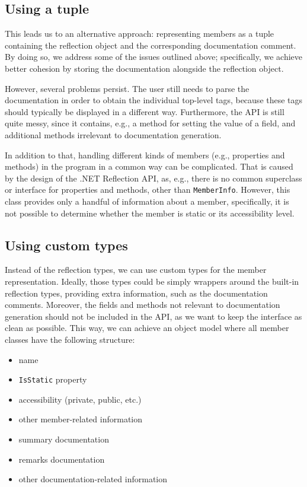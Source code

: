 \subsection*{Using a tuple}

This leads us to an alternative approach: representing members as a tuple containing the reflection object and the corresponding documentation comment.
By doing so, we address some of the issues outlined above; specifically, we achieve better cohesion by storing the documentation alongside the reflection object.

However, several problems persist.
The user still needs to parse the documentation in order to obtain the individual top-level tags, because these tags should typically be displayed in a different way.
Furthermore, the API is still quite messy, since it contains, e.g., a method for setting the value of a field, and additional methods irrelevant to documentation generation.

In addition to that, handling different kinds of members (e.g., properties and methods) in the program in a common way can be complicated.
That is caused by the design of the .NET Reflection API, as, e.g., there is no common superclass or interface for properties and methods, other than \texttt{MemberInfo}.
However, this class provides only a handful of information about a member, specifically, it is not possible to determine whether the member is static or its accessibility level.

\subsection*{Using custom types}

Instead of the reflection types, we can use custom types for the member representation.
Ideally, those types could be simply wrappers around the built-in reflection types, providing extra information, such as the documentation comments.
Moreover, the fields and methods not relevant to documentation generation should not be included in the API, as we want to keep the interface as clean as possible.
This way, we can achieve an object model where all member classes have the following structure:

\begin{itemize}
    \item name
    \item \texttt{IsStatic} property
    \item accessibility (private, public, etc.)
    \item other member-related information
    \item summary documentation
    \item remarks documentation
    \item other documentation-related information
\end{itemize}

